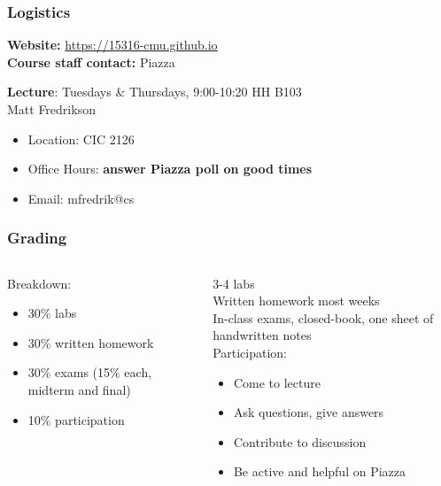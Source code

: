 \documentclass[10pt,handout]{beamer}
\begin{document}
\begin{frame}

\frametitle{Logistics}

\textbf{Website:} \url{https://15316-cmu.github.io}
\\[1em]

\textbf{Course staff contact:} Piazza

\textbf{Lecture}: Tuesdays \& Thursdays, 9:00-10:20 HH B103
\\[1em]

Matt Fredrikson
\begin{itemize}
\item Location: CIC 2126
\item Office Hours: \textbf{answer Piazza poll on good times}
\item Email: mfredrik@cs
\end{itemize}

\end{frame}


\begin{frame}

\frametitle{Grading}

\begin{columns}
\begin{column}{0.45\textwidth}
Breakdown:
\begin{itemize}
\item 30\% labs
\item 30\% written homework
\item 30\% exams (15\% each, midterm and final)
\item 10\% participation
\end{itemize}
\end{column}

\begin{column}{0.55\textwidth}
3-4 labs
\\[1em]

Written homework most weeks
\\[1em]

In-class exams, closed-book, one sheet of handwritten notes
\\[1em]

Participation:
\begin{itemize}
\item Come to lecture
\item Ask questions, give answers
\item Contribute to discussion
\item Be active and helpful on Piazza
\end{itemize}
\end{column}
\end{columns}

\end{frame}
\end{document}
